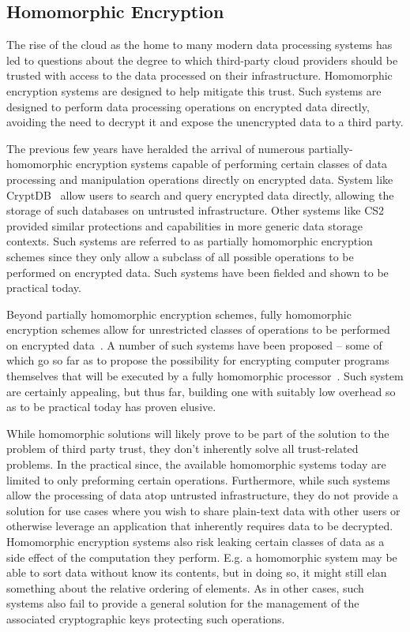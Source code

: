 \subsection{Homomorphic Encryption}

The rise of the cloud as the home to many modern data processing
systems has led to questions about the degree to which third-party
cloud providers should be trusted with access to the data processed on
their infrastructure. Homomorphic encryption systems are designed to
help mitigate this trust. Such systems are designed to perform data
processing operations on encrypted data directly, avoiding the need to
decrypt it and expose the unencrypted data to a third party.

The previous few years have heralded the arrival of numerous
partially-homomorphic encryption systems capable of performing certain
classes of data processing and manipulation operations directly on
encrypted data. System like CryptDB~\cite{popa2011} allow users to
search and query encrypted data directly, allowing the storage of such
databases on untrusted infrastructure. Other systems like
CS2~\cite{kamara2011} provided similar protections and capabilities in
more generic data storage contexts. Such systems are referred to as
partially homomorphic encryption schemes since they only allow a
subclass of all possible operations to be performed on encrypted
data. Such systems have been fielded and shown to be practical today.

Beyond partially homomorphic encryption schemes, fully homomorphic
encryption schemes allow for unrestricted classes of operations to be
performed on encrypted data~\cite{gentry2009}. A number of such
systems have been proposed -- some of which go so far as to propose
the possibility for encrypting computer programs themselves that will
be executed by a fully homomorphic processor~\cite{Breuer2013,
  Brenner2011}. Such system are certainly appealing, but thus far,
building one with suitably low overhead so as to be practical today
has proven elusive.

While homomorphic solutions will likely prove to be part of the
solution to the problem of third party trust, they don't inherently
solve all trust-related problems. In the practical since, the
available homomorphic systems today are limited to only preforming
certain operations. Furthermore, while such systems allow the
processing of data atop untrusted infrastructure, they do not provide
a solution for use cases where you wish to share plain-text data with
other users or otherwise leverage an application that inherently
requires data to be decrypted. Homomorphic encryption systems also
risk leaking certain classes of data as a side effect of the
computation they perform. E.g. a homomorphic system may be able to
sort data without know its contents, but in doing so, it might still
elan something about the relative ordering of elements. As in other
cases, such systems also fail to provide a general solution for the
management of the associated cryptographic keys protecting such
operations.

